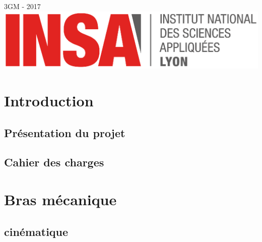 \documentclass[a4paper, titlepage]{report}
\begin{document}
\begin{titlepage}
{\large 3GM - 2017}\\[3cm] %


\includegraphics [scale = 0.3] {logoINSA.eps}\\


\vfill %

\end{titlepage}



	 
	\chapter {Introduction}
		\section {Présentation du projet}
		\section {Cahier des charges}
	\chapter {Bras mécanique}
		\section {cinématique}
\end{document}
